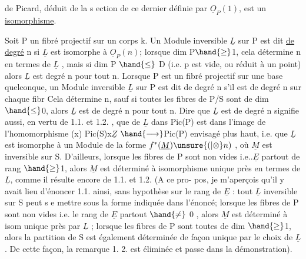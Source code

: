 de Picard, déduit de la s ection de ce dernier définie par $\underline{O}_P(1)$, est un
\uline{isomorphisme}.

Soit P un fibré projectif sur un corps k. Un Module inversible
$\underline{L}$ sur P est dit \uline{de degré} n si $\underline{L}$ est isomorphe à $\underline{O}_P(n)$; lorsque
dim P$\hand{\geq}$1, cela détermine n en termes de $\underline{L}$ , mais si dim P $\hand{\leq}$ D
(i.e. p est vide, ou réduit à un point) alors $\underline{L}$ est degré n pour tout n.
Lorsque P est un fibré projectif sur une base quelconque, un Module
inversible $\underline{L}$ sur P est dit de degré n s'il est de degré n sur chaque fibr
Cela détermine n, sauf si toutes les fibres de P/S sont de dim$\hand{\leq}$0, alors
$\underline{L}$ est de degré n pour tout n. Dire que $\underline{L}$ est de degré n signifie aussi,
en vertu de 1.1. et 1.2. , que   de $\underline{L}$ dans Pic(P) est dans
l'image de  l'homomorphisme (x) Pic(S)x$\underline{Z}$ $\hand{\longrightarrow}$Pic(P) envisagé plus haut,
i.e. que $\underline{L}$ est isomorphe à un Module de la forme $f^*(\underline{M})\unsure{(|\otimes}n)$ , où $\underline{M}$ est
inversible sur S. D'ailleurs, lorsque les fibres de P sont non vides
i.e..$\underline{E}$ partout de rang $\hand{\geq}$1, alors $\underline{M}$ est déterminé à isomorphisme unique\margin{\ensuremath{/}}
\margin{\textbar}près en termes de $\underline{L}$, comme il résulte encore de 1.1. et 1.2. (A ce pro-%
pos, je m'aperçois qu'il y avait lieu d'énoncer 1.1. ainsi, sans hypothèse
sur le rang de $\underline{E}$ : tout $\underline{L}$ inversible sur S peut s e mettre sous la forme
indiquée dans l'énoncé; lorsque les fibres de P sont non vides i.e. le
rang de $\underline{E}$ partout $\hand{\neq}$ 0 , alors $\underline{M}$ est déterminé à isom unique près par
$\underline{L}$ ; lorsque les fibres de P sont toutes de dim $\hand{\geq}$1,  alors la partition
de S est également déterminée de façon unique par le choix de $\underline{L}$. De cette
façon, la remarque 1. 2. est éliminée et passe dans la démonstration).\margin{\ensuremath{\swarrow}}

